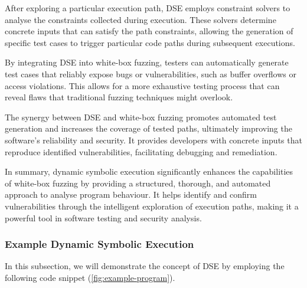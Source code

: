 After exploring a particular execution path, DSE employs constraint solvers to analyse the constraints collected during execution. These solvers determine concrete inputs that can satisfy the path constraints, allowing the generation of specific test cases to trigger particular code paths during subsequent executions.

By integrating DSE into white-box fuzzing, testers can automatically generate test cases that reliably expose bugs or vulnerabilities, such as buffer overflows or access violations. This allows for a more exhaustive testing process that can reveal flaws that traditional fuzzing techniques might overlook.

The synergy between DSE and white-box fuzzing promotes automated test generation and increases the coverage of tested paths, ultimately improving the software's reliability and security. It provides developers with concrete inputs that reproduce identified vulnerabilities, facilitating debugging and remediation.

In summary, dynamic symbolic execution significantly enhances the capabilities of white-box fuzzing by providing a structured, thorough, and automated approach to analyse program behaviour. It helps identify and confirm vulnerabilities through the intelligent exploration of execution paths, making it a powerful tool in software testing and security analysis.


\subsubsection{Example Dynamic Symbolic Execution}
In this subsection, we will demonstrate the concept of DSE by employing the following code snippet (\autoref{fig:example-program}). 


\vspace{0.5cm}

